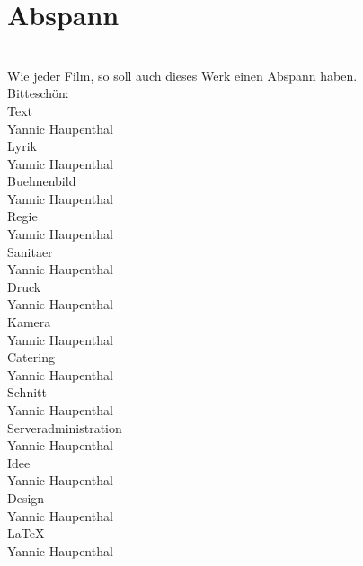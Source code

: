 \chapter{Abspann}
\label{chp:abspann}

\\

Wie jeder Film, so soll auch dieses Werk einen Abspann haben.\\
Bittesch\"on:\\

Text\\
Yannic Haupenthal\\

Lyrik\\
Yannic Haupenthal\\

Buehnenbild\\
Yannic Haupenthal\\

Regie\\
Yannic Haupenthal\\

Sanitaer\\
Yannic Haupenthal\\

Druck\\
Yannic Haupenthal\\

Kamera\\
Yannic Haupenthal\\

Catering\\
Yannic Haupenthal\\

Schnitt\\
Yannic Haupenthal\\

Serveradministration\\
Yannic Haupenthal\\

Idee\\
Yannic Haupenthal\\

Design\\
Yannic Haupenthal\\

\LaTeX{}\\
Yannic Haupenthal\\
